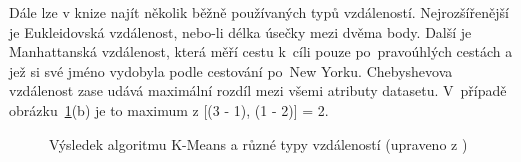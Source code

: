 Dále lze v knize najít několik běžně používaných typů vzdáleností. Nejrozšířenější je Eukleidovská vzdálenost, nebo-li délka úsečky mezi dvěma body. Další je Manhattanská vzdálenost, která měří cestu k~cíli pouze po~pravoúhlých cestách a jež si své jméno vydobyla podle cestování po~New Yorku. Chebyshevova vzdálenost zase udává maximální rozdíl mezi všemi atributy datasetu. V~případě obrázku~\ref{k-means-img}(b) je to maximum z [(3 - 1), (1 - 2)] = 2. 

\begin{figure}[tbh]
    \centering
    \qquad
    \caption{Výsledek algoritmu K-Means a různé typy vzdáleností (upraveno z \cite{data-science-concepts-and-practice})}
    \label{k-means-img}
\end{figure}

